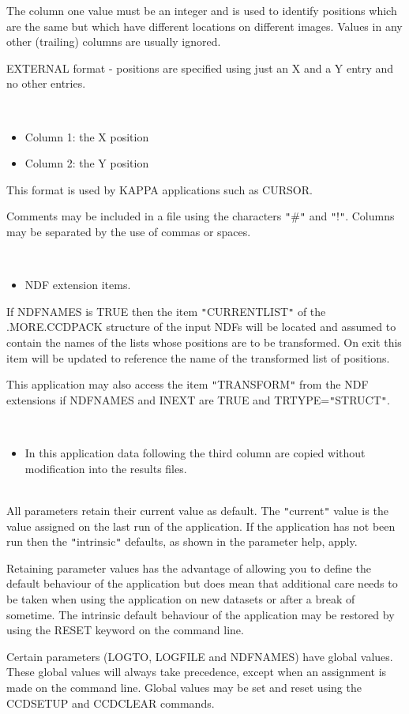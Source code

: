 \documentclass[twoside,11pt]{article}
\newcommand{\htmlref}[2]{#1}
\newcommand{\xref}[3]{#1}
\renewcommand{\_}{\texttt{\symbol{95}}}
\newcommand{\qt}[1]{{\tt "}#1{\tt "}}
\newcommand{\xroutine}[1]{\htmlref{{\sc #1}}{#1}}
\newcommand{\sstdiytopic}[2]{\item[#1:] \mbox{} \\[1.3ex] #2}
\newcommand{\sstitemlist}[1]{
  \mbox{} \\
  \vspace{-3.5ex}
  \begin{itemize}
     #1
  \end{itemize}
}
\newcommand{\sstitem}{\item}
\newcommand{\sstdiytopic}[2]{\item[{#1:}] #2 }
\newcommand{\sstitemlist}[1]{
      \begin{itemize}
         #1
      \end{itemize}
      \\
   }
\newcommand{\sstitem}{\item}
\begin{document}
{{{      }
        The column one value must be an integer and is used to identify
        positions which are the same but which have different locations
        on different images. Values in any other (trailing) columns are
        usually ignored.

        EXTERNAL format - positions are specified using just an X and
        a Y entry and no other entries.

      \sstitemlist{

         \sstitem
             Column 1: the X position

         \sstitem
             Column 2: the Y position

      }
        This format is used by KAPPA applications such as
       \xref{CURSOR}{sun95}{CURSOR}.

        Comments may be included in a file using the characters \qt{\#} and
        \qt{!}. Columns may be separated by the use of commas or spaces.

      \sstitemlist{

         \sstitem
         NDF extension items.

      }
        If NDFNAMES is TRUE then the item \qt{CURRENT\_LIST} of the
        .MORE.CCDPACK structure of the input NDFs will be located
        and assumed to contain the names of the lists whose positions
        are to be transformed. On exit this item will be updated to
        reference the name of the transformed list of positions.

        This application may also access the item \qt{TRANSFORM} from
        the NDF extensions if NDFNAMES and INEXT are TRUE and
        TRTYPE=\qt{STRUCT}.

      \sstitemlist{

         \sstitem
         In this application data following the third column are copied
           without modification into the results files.
      }
   }
   \sstdiytopic{
      Behaviour of parameters
   }{
      All parameters retain their current value as default. The
      \qt{current} value is the value assigned on the last run of the
      application. If the application has not been run then the
      \qt{intrinsic} defaults, as shown in the parameter help, apply.

      Retaining parameter values has the advantage of allowing you to
      define the default behaviour of the application but does mean
      that additional care needs to be taken when using the application
      on new datasets or after a break of sometime.  The intrinsic
      default behaviour of the application may be restored by using the
      RESET keyword on the command line.

      Certain parameters (LOGTO, LOGFILE and NDFNAMES) have global
      values. These global values will always take precedence, except
      when an assignment is made on the command line.  Global values may
      be set and reset using the \xroutine{CCDSETUP} and \xroutine{CCDCLEAR} commands.
   }
}
\end{document}
